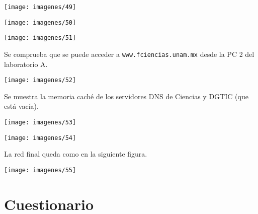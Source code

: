 \documentclass{article}
\begin{document}
\begin{center}
\texttt{[image: imagenes/49]}

\texttt{[image: imagenes/50]}

\texttt{[image: imagenes/51]}
\end{center}

Se comprueba que se puede acceder a \texttt{www.fciencias.unam.mx} desde la PC 2 del laboratorio A.

\begin{center}
\texttt{[image: imagenes/52]}
\end{center}

Se muestra la memoria caché de los servidores DNS de Ciencias y DGTIC (que está vacía).

\begin{center}
\texttt{[image: imagenes/53]}

\texttt{[image: imagenes/54]}
\end{center}

La red final queda como en la siguiente figura.

\begin{center}
\texttt{[image: imagenes/55]}
\end{center}

\section{Cuestionario}
\end{document}

